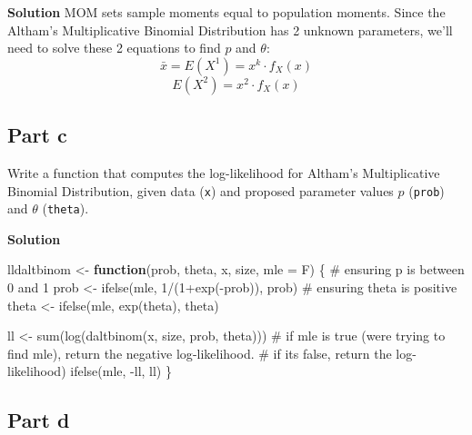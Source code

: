 \documentclass[
]{article}
\newenvironment{Shaded}{\begin{snugshade}}{\end{snugshade}}
\newcommand{\AttributeTok}[1]{\textcolor[rgb]{0.40,0.45,0.13}{#1}}
\newcommand{\CommentTok}[1]{\textcolor[rgb]{0.37,0.37,0.37}{#1}}
\newcommand{\ControlFlowTok}[1]{\textcolor[rgb]{0.00,0.23,0.31}{\textbf{#1}}}
\newcommand{\DecValTok}[1]{\textcolor[rgb]{0.68,0.00,0.00}{#1}}
\newcommand{\FunctionTok}[1]{\textcolor[rgb]{0.28,0.35,0.67}{#1}}
\newcommand{\NormalTok}[1]{\textcolor[rgb]{0.00,0.23,0.31}{#1}}
\newcommand{\OtherTok}[1]{\textcolor[rgb]{0.00,0.23,0.31}{#1}}
\newcommand{\SpecialCharTok}[1]{\textcolor[rgb]{0.37,0.37,0.37}{#1}}
\begin{document}
\textbf{Solution} MOM sets sample moments equal to population moments.
Since the Altham's Multiplicative Binomial Distribution has 2 unknown
parameters, we'll need to solve these 2 equations to find \(p\) and
\(\theta\): \[\bar{x} = E(X^1) = x^k \cdot f_X(x)\]
\[E(X^2) = x^2 \cdot f_X(x)\]

\subsection{Part c}\label{part-c-1}

Write a function that computes the log-likelihood for Altham's
Multiplicative Binomial Distribution, given data (\texttt{x}) and
proposed parameter values \(p\) (\texttt{prob}) and \(\theta\)
(\texttt{theta}).

\textbf{Solution}

\normalsize

\begin{Shaded}
\begin{Highlighting}[numbers=left,,]
\NormalTok{lldaltbinom }\OtherTok{\textless{}{-}} \ControlFlowTok{function}\NormalTok{(prob, theta, x, size, }\AttributeTok{mle =}\NormalTok{ F) \{}
  \CommentTok{\# ensuring p is between 0 and 1}
\NormalTok{  prob }\OtherTok{\textless{}{-}} \FunctionTok{ifelse}\NormalTok{(mle, }\DecValTok{1}\SpecialCharTok{/}\NormalTok{(}\DecValTok{1}\SpecialCharTok{+}\FunctionTok{exp}\NormalTok{(}\SpecialCharTok{{-}}\NormalTok{prob)), prob) }
  \CommentTok{\# ensuring theta is positive}
\NormalTok{  theta }\OtherTok{\textless{}{-}} \FunctionTok{ifelse}\NormalTok{(mle, }\FunctionTok{exp}\NormalTok{(theta), theta)}

\NormalTok{  ll }\OtherTok{\textless{}{-}} \FunctionTok{sum}\NormalTok{(}\FunctionTok{log}\NormalTok{(}\FunctionTok{daltbinom}\NormalTok{(x, size, prob, theta)))}
  \CommentTok{\# if mle is true (we\textquotesingle{}re trying to find mle), return the negative log{-}likelihood. }
  \CommentTok{\# if it\textquotesingle{}s false, return the log{-}likelihood)}
  \FunctionTok{ifelse}\NormalTok{(mle, }\SpecialCharTok{{-}}\NormalTok{ll, ll)}
\NormalTok{\}}
\end{Highlighting}
\end{Shaded}

\normalsize

\subsection{Part d}\label{part-d}
\end{document}
